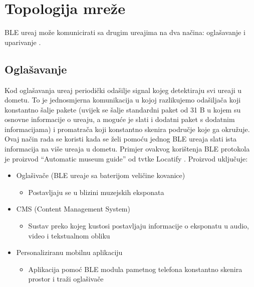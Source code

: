 \section{Topologija mre\v{z}e}

BLE ure\dj aj mo\v{z}e komunicirati sa drugim ure\dj ajima na dva na\v{c}ina: ogla\v{s}avanje i uparivanje \cite{ble_getting_started}.

\subsection{Ogla\v{s}avanje}

Kod ogla\v{s}avanja ure\dj aj periodi\v{c}ki oda\v{s}ilje signal kojeg detektiraju svi ure\dj aji u dometu. To je jednosmjerna komunikacija u kojoj razlikujemo oda\v{s}ilja\v{c}a koji konstantno \v{s}alje pakete (uvijek se \v{s}alje standardni paket od 31 B u kojem su osnovne informacije o ure\dj aju, a mogu\'{c}e je slati i dodatni paket s dodatnim informacijama) i promatra\v{c}a koji konstantno skenira podru\v{c}je koje ga okru\v{z}uje. Ovaj na\v{c}in rada se koristi kada se \v{z}eli pomo\'{c}u jednog BLE ure\dj aja slati ista informacija na vi\v{s}e ure\dj aja u dometu. Primjer ovakvog kori\v{s}tenja BLE protokola je proizvod ``Automatic museum guide'' od tvtke Locatify \cite{automatic_museum_guide} . Proizvod uklju\v{c}uje:


\begin{itemize}
	\item Ogla\v{s}iva\v{c}e (BLE ure\dj aje sa baterijom veli\v{c}ine kovanice)
	\begin{itemize}
		\item Postavljaju se u blizini muzejskih eksponata
	\end{itemize}
	\item CMS (Content Management System)
	\begin{itemize}
		\item Sustav preko kojeg kustosi postavljaju informacije o eksponatu u audio, video i tekstualnom obliku
	\end{itemize}
	
	\item Personaliziranu mobilnu aplikaciju
	\begin{itemize}
		\item Aplikacija pomo\'{c} BLE modula pametnog telefona konstantno skenira prostor i tra\v{z}i ogla\v{s}iva\v{c}e
	\end{itemize}
\end{itemize}

